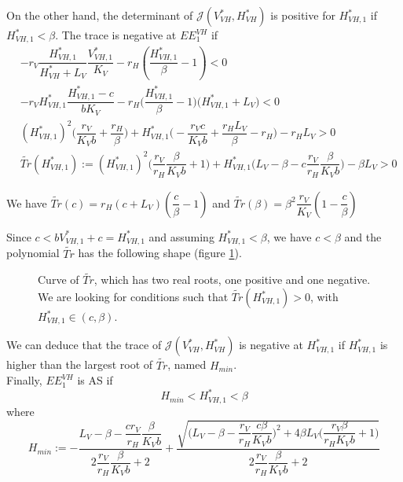 \documentclass{article}
\begin{document}
\begin{itemize}
On the other hand, the determinant of $\mathcal{J}(V^*_{VH}, H^*_{VH})$ is positive for $H^*_{VH, 1}$ if $H^*_{VH, 1} < \beta$.
The trace is negative at $EE^{VH}_1$  if 
\begin{subequations}
\begin{align}
&-r_V  \dfrac{H^*_{VH, 1}}{H^*_{VH}+L_V}\dfrac{V^*_{VH, 1}}{K_V} - r_H(\dfrac{H^*_{VH, 1}}{\beta} - 1) <0 \\
& -r_V  H^*_{VH, 1} \dfrac{H^*_{VH, 1} - c}{b K_V} - r_H \Big(\dfrac{H^*_{VH, 1}}{\beta} - 1\Big)\Big(H^*_{VH, 1}+L_V \Big) <0 \\
&(H^*_{VH, 1})^2 \Big(\dfrac{r_V}{K_Vb} + \dfrac{r_H}{\beta} \Big) + H^*_{VH, 1} \Big(-\dfrac{r_V c}{K_V	b} + \dfrac{r_H L_V}{\beta} - r_H \Big) - r_H L_V > 0 \\
&\tilde{Tr}(H^*_{VH, 1}) := (H^*_{VH, 1})^2\Big(\dfrac{r_V}{r_H}\dfrac{\beta}{K_Vb} + 1 \Big) + H^*_{VH, 1} \Big(L_V - \beta - c \dfrac{r_V}{r_H}\dfrac{\beta}{K_V	b}\Big) - \beta L_V > 0
\end{align}
\end{subequations}

We have $\tilde{Tr}(c) = r_H (c+ L_V) (\dfrac{c}{\beta}-1)$ and $\tilde{Tr}(\beta) = \beta^2 \dfrac{r_V}{K_V}(1 - \dfrac{c}{\beta})$

Since $c < b V^*_{VH, 1} + c = H^*_{VH, 1}$ and assuming $H^*_{VH, 1} < \beta$, we have $c < \beta$ and the polynomial $\tilde{Tr}$ has the following shape (figure \ref{fig:Tr tilde}).
\begin{figure}[ht]
\centering
{}
\caption{\centering Curve of $\tilde{Tr}$, which has two real roots, one positive and one negative. We are looking for conditions such that $\tilde{Tr}(H_{VH,1}^*) > 0$, with $H_{VH,1}^*\in (c, \beta)$. }
\label{fig:Tr tilde}
\end{figure}

We can deduce that the trace of $\mathcal{J}(V^*_{VH}, H^*_{VH})$ is negative at $H^*_{VH, 1} $ if $H^*_{VH, 1} $ is higher than the largest root of $\tilde{Tr}$, named $H_{min}$.
\\

Finally, $EE^{VH}_1$ is AS if 
\begin{equation}
H_{min} < H^*_{VH, 1} < \beta
\end{equation}
where 
\begin{equation}
H_{min} := -\dfrac{L_V - \beta - \dfrac{c r_V}{r_H}\dfrac{\beta}{K_V	b}}{2\dfrac{r_V}{r_H}\dfrac{\beta}{K_Vb} + 2} + \dfrac{\sqrt{\Big(L_V - \beta - \dfrac{r_V}{r_H}\dfrac{c \beta}{K_V	b}\Big)^2 + 4 \beta L_V \Big(\dfrac{r_V\beta}{r_H K_V b} + 1\Big)}}{2\dfrac{r_V}{r_H}\dfrac{\beta}{K_Vb} + 2} 
\label{equilibreVH:Hmin}
\end{equation}
\end{itemize}
\end{document}

